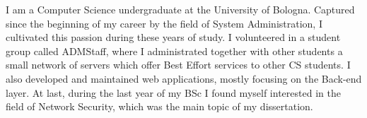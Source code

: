 
\par{
I am a Computer Science undergraduate at the University of Bologna.
Captured since the beginning of my career by the field of System Administration,
I cultivated this passion during these years of study. I volunteered in a student
group called ADMStaff, where I administrated together with other students a small network of
servers which offer Best Effort services to other CS students.
I also developed and maintained web applications, mostly focusing on the Back-end layer.
At last, during the last year of my BSc I found myself interested in the field of Network Security,
which was the main topic of my dissertation.
}
